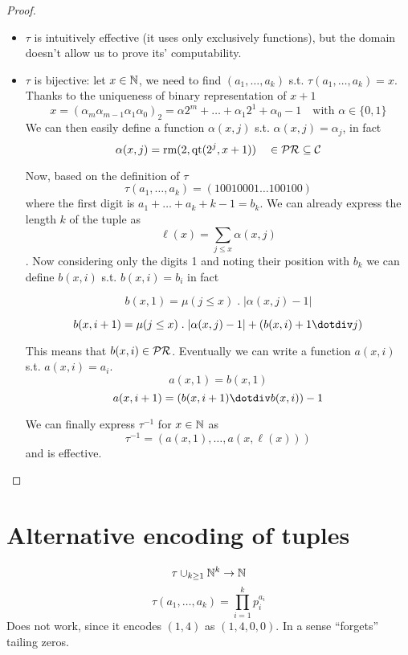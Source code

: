 \begin{lemma}
\begin{proof}
\begin{enumerate}[label=(\arabic*)]
{        \begin{itemize}
        \item $\tau$ is intuitively effective (it uses only
          exclusively functions), but the domain doesn't allow us to
          prove its' computability.
        \item $\tau$ is bijective: let $x \in \mathbb{N}$, we need to find
          $(a_1, \dots, a_k)$ s.t. $\tau(a_1,\dots,a_k) = x$. Thanks
          to the uniqueness of binary representation of $x+1$
          \[x = (\alpha_m \alpha_{m-1} \alpha_1 \alpha_0)_2 = \alpha
            2^m + \dots + \alpha_1 2^1 + \alpha_0 - 1 \quad \text{with
            } \alpha \in \{0,1\} \] We can then easily define a
          function $\alpha(x,j)$ s.t. $\alpha(x,j) = \alpha_j$, in
          fact
          \[\alpha(x, j) = \text{rm}(2, \text{qt}(2^j, x+1)) \quad \in
            \mathcal{PR} \subseteq \mathcal{C}\]

          Now, based on the definition of $\tau$
          \[\tau(a_1, \dots, a_k) = (1 0 0 1 0 0 0 1 \dots 1 0 0 1 0
            0)\] where the first digit is $a_1+\dots+a_k+k-1 =
          b_k$. We can already express the length $k$ of the tuple
          as \[\ell (x) = \sum_{j \leq x}\alpha(x,j)\]. Now considering
          only the digits 1 and noting their position with $b_k$ we
          can define $b(x,i)$ s.t. $b(x,i) = b_i$ in fact

          \[b(x,1) = \mu(j \leq x) \; . \; |\alpha(x,j) - 1|\]

          \[b(x,i+1) = \mu(j \leq x) \; . \; |\alpha(x,j)-1| +
            (b(x,i)+1 \dotdiv j)\]

          This means that $b(x,i)\in \mathcal{PR}$.  Eventually we can write a
          function $a(x,i)$ s.t. $a(x,i) = a_i$.
          \[a(x,1) = b(x,1)\]
          \[a(x,i+1) = (b(x,i+1) \dotdiv b(x,i))-1\]

          We can finally express $\tau^{-1}$ for $x \in \mathbb{N}$ as
          \[\tau^{-1} = (a(x,1), \dots, a(x, \ell(x)))\] and is
          effective.
        \end{itemize}
      }
    \end{enumerate}
  \end{proof}
\end{lemma}

\section{Alternative encoding of tuples}
$$\tau \cup_{k \geq 1} \mathbb{N}^k \rightarrow \mathbb{N}$$
$$\tau(a_1, \dots, a_k) = \prod_{i=1}^{k}p_i^{a_i}$$
Does not work, since it encodes $(1,4)$ as $(1,4,0,0)$. In a sense
``forgets'' tailing zeros.


